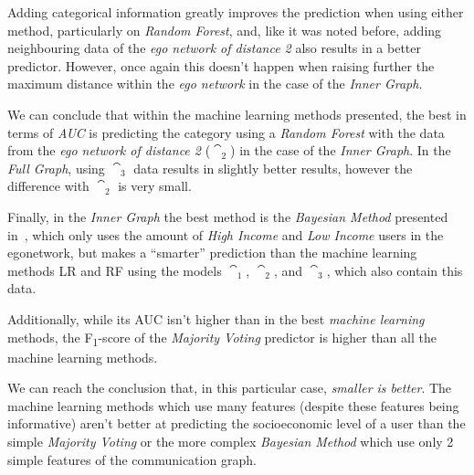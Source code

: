 Adding categorical information greatly improves the prediction when using either method, particularly on \emph{Random Forest}, and, like it was noted before, adding neighbouring data of the \emph{ego network of distance 2} also results in a better predictor. However, once again this doesn't happen when raising further the maximum distance within the \emph{ego network} in the case of the \emph{Inner Graph}.

We can conclude that within the {machine learning} methods presented, the best in terms of \emph{AUC} is predicting the category using a \emph{Random Forest} with the data from the \emph{ego network of distance 2} ($\cat_2$) in the case of the \emph{Inner Graph}. In the \emph{Full Graph}, using $\cat_3$ data results in slightly better results, however the difference with $\cat_2$ is very small.

Finally, in the \emph{Inner Graph} the best method is the \emph{Bayesian Method} presented in~\cite{fixmanasonam2016}, which only uses the amount of \emph{High Income} and \emph{Low Income} users in the egonetwork, but makes a ``smarter'' prediction than the {machine learning} methods LR and RF using the models $\cat_1$, $\cat_2$, and $\cat_3$, which also contain this data. 

Additionally, while its AUC isn't higher than in the best \emph{machine learning} methods, the F\textsubscript{1}-score of the \emph{Majority Voting} predictor is higher than all the {machine learning} methods.

We can reach the conclusion that, in this particular case, \emph{smaller is better}. The {machine learning} methods which use many features (despite these features being informative) aren't better at predicting the socioeconomic level of a user than the simple \emph{Majority Voting} or the more complex \emph{Bayesian Method} which use only 2 simple features of the communication graph.


